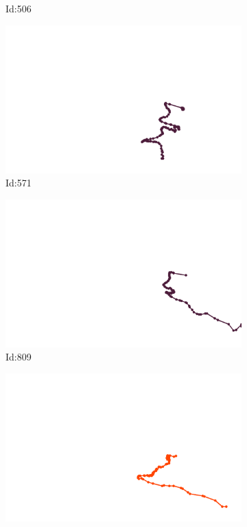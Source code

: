 \documentclass[12pt,twoside]{report}
\begin{document}
\begin{figure}
\begin{subfigure}[b]{0.20\textwidth}
\caption{Id:506}
\end{subfigure}
\begin{subfigure}[b]{0.20\textwidth}
\centering
\includegraphics[width=\textwidth]{../../trajectories/571.png}
\caption{Id:571}
\end{subfigure}
\begin{subfigure}[b]{0.20\textwidth}
\centering
\includegraphics[width=\textwidth]{../../trajectories/809.png}
\caption{Id:809}
\end{subfigure}
\begin{subfigure}[b]{0.20\textwidth}
\centering
\includegraphics[width=\textwidth]{../../trajectories/821.png}

\end{subfigure}
\end{figure}
\end{document}
